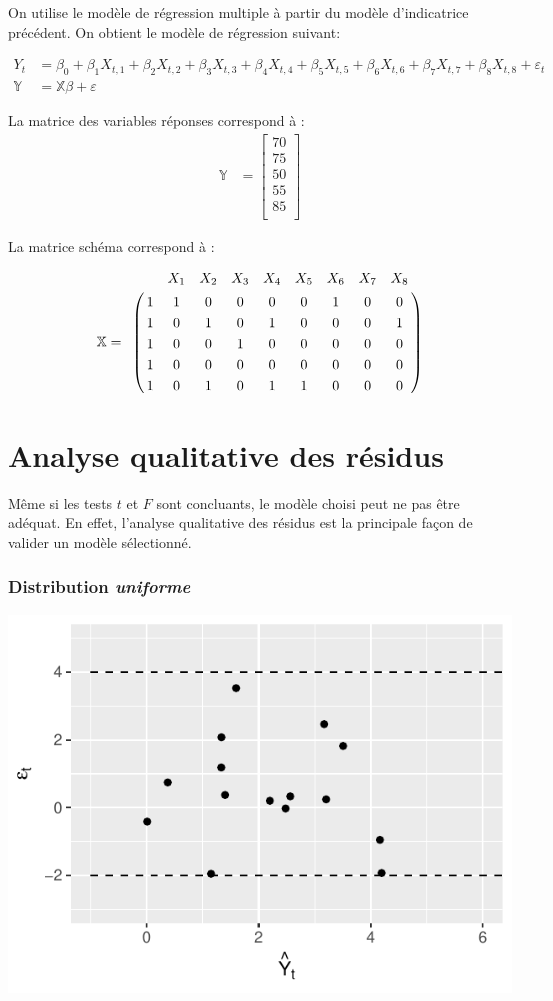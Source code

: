 \documentclass[11pt,french]{report}
\begin{document}
On utilise le modèle de régression multiple à partir du modèle d'indicatrice précédent. On obtient le modèle de régression suivant:

\begin{align*}
Y_t &= \beta_0 + \beta_1X_{t,1} + \beta_2X_{t,2} + \beta_3X_{t,3} 
+ \beta_4X_{t,4} + \beta_5X_{t,5} + \beta_6X_{t,6} + \beta_7X_{t,7} + \beta_8X_{t,8} + \varepsilon_t \\
\mathbb{Y} &= \mathbb{X}\mathbb{\beta} + \mathbb{\varepsilon}
\end{align*}

La matrice des variables réponses correspond à :
\begin{align*}
\mathbb{Y} &= 
\begin{bmatrix}
70 \\
75 \\
50 \\
55 \\
85 \\
\end{bmatrix}
\end{align*}

La matrice schéma correspond à :

\begin{align*}
\mathbb{X}
=
\bordermatrix { 
& &  X_1  & X_2 & X_3 & X_4 & X_5  & X_6 & X_7 & X_8 \cr 
& 1 & 1 & 0 & 0 & 0 & 0 & 1 & 0 & 0 \cr 
& 1 & 0 & 1 & 0 & 1 & 0 & 0 & 0 & 1 \cr 
& 1 & 0 & 0 & 1 & 0 & 0 & 0 & 0 & 0 \cr 
& 1 & 0 & 0 & 0 & 0 & 0 & 0 & 0 & 0 \cr 
& 1 & 0 & 1 & 0 & 1 & 1 & 0 & 0 & 0 \cr 
}
\end{align*}

\section{Analyse qualitative des résidus}
Même si les tests $t$ et $F$ sont concluants, le modèle choisi peut ne pas être adéquat. En effet, l'analyse qualitative des résidus est la principale façon de valider un modèle sélectionné. 

\subsubsection*{Distribution \emph{uniforme}}
\includegraphics{notes_de_cours-031}
\end{document}
